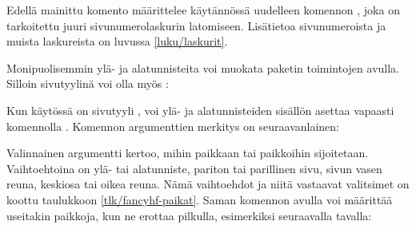 \noindent
Edellä mainittu komento määrittelee käytännössä uudelleen komennon
, joka on tarkoitettu juuri sivunumerolaskurin
latomiseen. Lisätietoa sivunumeroista ja muista laskureista on luvussa
\ref{luku/laskurit}.


Monipuolisemmin ylä- ja alatunnisteita voi muokata paketin
 toimintojen avulla. Silloin sivutyylinä voi olla
myös :

\begin{koodilohkosis}
\usepackage{fancyhdr}
\pagestyle{fancy}
\end{koodilohkosis}

\noindent
Kun käytössä on sivutyyli , voi ylä- ja alatunnisteiden
sisällön asettaa vapaasti komennolla . Komennon
argumenttien merkitys on seuraavanlainen:

\begin{koodilohkosis}
\end{koodilohkosis}

\noindent
Valinnainen argumentti  kertoo, mihin paikkaan tai
paikkoihin  sijoitetaan. Vaihtoehtoina on ylä- tai
alatunniste, pariton tai parillinen sivu, sivun vasen reuna, keskiosa
tai oikea reuna. Nämä vaihtoehdot ja niitä vastaavat valitsimet on
koottu taulukkoon \ref{tlk/fancyhf-paikat}. Saman komennon avulla voi
määrittää useitakin paikkoja, kun ne erottaa pilkulla, esimerkiksi
seuraavalla tavalla:


